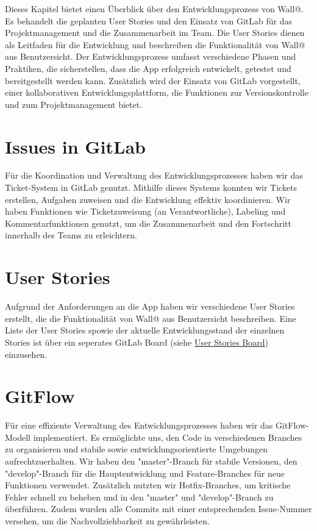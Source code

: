
Dieses Kapitel bietet einen Überblick über den Entwicklungsprozess von Wall@. 
Es behandelt die geplanten User Stories und den Einsatz von GitLab für das Projektmanagement und die Zusammenarbeit im Team.
Die User Stories dienen als Leitfaden für die Entwicklung und beschreiben die Funktionalität von Wall@ aus Benutzersicht. 
Der Entwicklungsprozess umfasst verschiedene Phasen und Praktiken, die sicherstellen, dass die App erfolgreich entwickelt, getestet und bereitgestellt werden kann.
Zusätzlich wird der Einsatz von GitLab vorgestellt, einer kollaborativen Entwicklungsplattform, die Funktionen zur Versionskontrolle und zum Projektmanagement bietet.

\section{Issues in GitLab}
Für die Koordination und Verwaltung des Entwicklungsprozesses haben wir das Ticket-System in GitLab genutzt. 
Mithilfe dieses Systems konnten wir Tickets erstellen, Aufgaben zuweisen und die Entwicklung effektiv koordinieren. 
Wir haben Funktionen wie Ticketzuweisung (an Verantwortliche), Labeling und Kommentarfunktionen genutzt, 
um die Zusammenarbeit und den Fortschritt innerhalb des Teams zu erleichtern.

\section{User Stories}
Aufgrund der Anforderungen an die App haben wir verschiedene User Stories erstellt, 
die die Funktionalität von Wall@ aus Benutzersicht beschreiben.
Eine Liste der User Stories spowie der aktuelle Entwicklungsstand der einzelnen Stories ist über ein 
seperates GitLab Board (siehe \href{https://gitlab.in.htwg-konstanz.de/mobile-anwendungen-ss23/gruppen/gruppe-4/-/boards/272}{User Stories Board}) einzusehen.

\section{GitFlow}
Für eine effiziente Verwaltung des Entwicklungsprozesses haben wir das GitFlow-Modell implementiert. 
Es ermöglichte uns, den Code in verschiedenen Branches zu organisieren und stabile sowie entwicklungsorientierte Umgebungen aufrechtzuerhalten. 
Wir haben den "master"-Branch für stabile Versionen, den "develop"-Branch für die Hauptentwicklung und Feature-Branches für neue 
Funktionen verwendet. Zusätzlich nutzten wir Hotfix-Branches, um kritische Fehler schnell zu beheben und in den "master" und 
"develop"-Branch zu überführen. Zudem wurden alle Commits mit einer entsprechenden Issue-Nummer versehen, 
um die Nachvollziehbarkeit zu gewährleisten.
